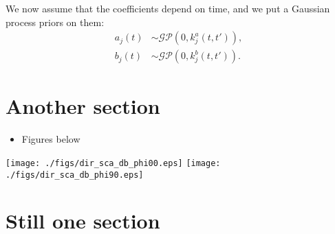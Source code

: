 \documentclass[portrait,a0,final]{a0poster} %
\newcommand{\sectionspace}{10mm} %
\newcommand{\figurespace}{10mm} %
\begin{document}
\begin{minipage}{0.98\linewidth}
\begin{minipage}[t]{0.47\linewidth}
We now assume that the coefficients depend on time, and we put a Gaussian process priors on them:
%
\begin{equation}
\begin{split}
a_j(t) &\sim \mathcal{GP}(0,k^a_j(t,t')), \\
b_j(t) &\sim \mathcal{GP}(0,k^b_j(t,t')).
\end{split}
\end{equation}

\vspace{\sectionspace}
\section{Another section}


\begin{itemize}
		
	\item Figures below
	
\end{itemize}


\vspace{\figurespace}
\begin{center}
  	\texttt{[image: ./figs/dir\_sca\_db\_phi00.eps]}
  	\texttt{[image: ./figs/dir\_sca\_db\_phi90.eps]}
\end{center}
\vspace{\figurespace}






\end{minipage} %
\hspace{0.03\linewidth} %
\begin{minipage}[t]{0.47\linewidth}
\setlength{\parindent}{10mm} %








\section{Still one section}

\lipsum[3-4]







\vspace{\sectionspace}

\end{minipage}
\end{minipage}
\end{document}
